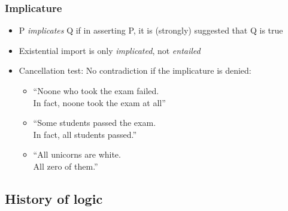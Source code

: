   \begin{frame}
  \frametitle{Implicature}

  \begin{itemize}[<+->]
  \item P \emph{implicates} Q if in asserting P, it is (strongly) suggested that Q is true
  \item Existential import is only \emph{implicated}, not \emph{entailed}
  \item Cancellation test: No contradiction if the implicature is denied:
  \begin{itemize}
  \item ``Noone who took the exam failed.\\
  In fact, noone took the exam at all''
  \item ``Some students passed the exam.\\
  In fact, all students passed.''
  \item ``All unicorns are white.\\
  All zero of them.''
  \end{itemize}
  \end{itemize}
\end{frame}

\newhourlecture 

\subsection{History of logic}

